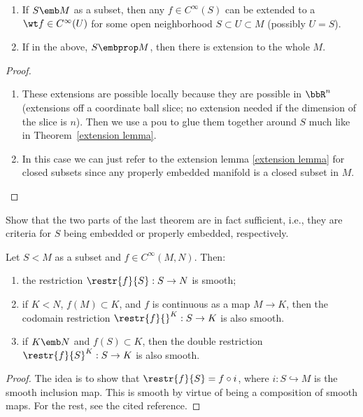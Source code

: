 \begin{thm}
\begin{enumerate}
    \item If $S\emb M$ as a subset, then any $f\in C^\infty(S)$ can be extended to a $\wt f\in C^\infty(U)$ for some open neighborhood $S\subset U\subset M$ (possibly $U=S$).
    \item If in the above, $S\embprop M$, then there is extension to the whole $M$.
\end{enumerate}
\end{thm}
\begin{proof}
\begin{enumerate}
    \item These extensions are possible locally because they are possible in $\bbR^n$ (extensions off a coordinate ball slice; no extension needed if the dimension of the slice is $n$). Then we use a \gls{pou} to glue them together around $S$ much like in Theorem~\ref{extension lemma}.
    \item In this case we can just refer to the extension lemma \ref{extension lemma} for closed subsets since any properly embedded manifold is a closed subset in $M$.
\end{enumerate}
\end{proof}

\begin{xca}
Show that the two parts of the last theorem are in fact sufficient, i.e., they are criteria for $S$ being embedded or properly embedded, respectively.
\end{xca}

\begin{thm}\label{thm 5.27 Lee}\label{thm restrictions to submfds}
Let $S< M$ as a subset and $f\in C^\infty(M,N)$. Then:
\begin{enumerate}
    \item the restriction $\restr{f}{S}:S\to N$ is smooth;
    \item if $K<N$, $f(M)\subset K$, and $f$ is continuous as a map $M\to K$, then the codomain restriction $\restr{f}{}^{K}:S\to K$ is also smooth.
    \item if $K\emb N$ and $f(S)\subset K$, then the double restriction $\restr{f}{S}^{K}:S\to K$ is also smooth.
\end{enumerate}
\end{thm}
\begin{proof}
The idea is to show that $\restr{f}{S}=f\circ i$, where $i:S\hookrightarrow M$ is the smooth inclusion map. This is smooth by virtue of being a composition of smooth maps. For the rest, see the cited reference.
\end{proof}

